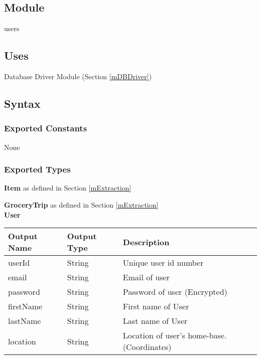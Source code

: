 \documentclass[12pt, titlepage]{article}
\begin{document}
\subsection{Module}

users

\subsection{Uses}

Database Driver Module (Section \ref{mDBDriver}) 

\subsection{Syntax}

\subsubsection{Exported Constants}
None

\subsubsection{Exported Types}
\textbf{Item} as defined in Section \ref{mExtraction} 

\noindent \textbf{GroceryTrip} as defined in Section \ref{mExtraction} \\

\noindent \textbf{User}

\begin{table}[H]
  \begin{tabular}{|p{}|p{}|p{}|}
    \hline
    \textbf{Output Name} & \textbf{Output Type} & \textbf{Description} \\
    \hline
    userId & String & Unique user id number \\
    \hline
    email & String & Email of user \\
    \hline
    password & String & Password of user (Encrypted) \\
    \hline
    firstName & String & First name of User \\
    \hline
    lastName & String & Last name of User \\
    \hline
    location & String & Location of user's home-base. (Coordinates) \\
    \hline
  \end{tabular}
\end{table}
\end{document}
